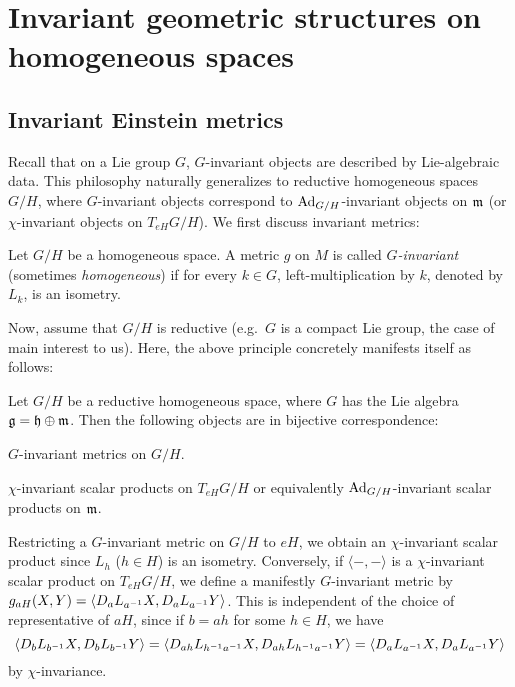 \section{Invariant geometric structures on homogeneous spaces}

\subsection{Invariant Einstein metrics}

Recall that on a Lie group $G$, $G$-invariant objects are described by Lie-algebraic data. This philosophy naturally generalizes to reductive homogeneous spaces $G/H$, where $G$-invariant objects correspond to $\operatorname{Ad}_{G/H}$-invariant objects on $\mathfrak{m}$ (or $\chi$-invariant objects on $T_{eH}G/H$). We first discuss invariant metrics:

\begin{mydef}
	Let $G/H$ be a homogeneous space. A metric $g$ on $M$ is called \emph{$G$-invariant} (sometimes \emph{homogeneous}) if for every $k\in G$, left-multiplication by $k$, denoted by $L_k$, is an isometry.
\end{mydef}

Now, assume that $G/H$ is reductive (e.g.~$G$ is a compact Lie group, the case of main interest to us). Here, the above principle concretely manifests itself as follows:

\begin{prop}\label{prop:invariantmetrics}
	Let $G/H$ be a reductive homogeneous space, where $G$ has the Lie algebra $\mathfrak{g}=\mathfrak{h}\oplus \mathfrak{m}$. Then the following objects are in bijective correspondence:
	\begin{numberedlist}
		\item $G$-invariant metrics on $G/H$.
		\item $\chi$-invariant scalar products on $T_{eH}G/H$ or equivalently $\operatorname{Ad}_{G/H}$-invariant scalar products on $\mathfrak{m}$.
	\end{numberedlist}
\end{prop}
\begin{myproof}
	Restricting a $G$-invariant metric on $G/H$ to $eH$, we obtain an $\chi$-invariant scalar product since $L_h$ ($h\in H$) is an isometry. Conversely, if $\langle-,-\rangle$ is a $\chi$-invariant scalar product on $T_{eH}G/H$, we define a manifestly $G$-invariant metric by $g_{aH}(X,Y)=\langle D_a L_{a^{-1}} X, D_a L_{a^{-1}} Y\rangle$. This is independent of the choice of representative of $aH$, since if $b=ah$ for some $h\in H$, we have
	\begin{equation*}
		\langle D_b L_{b^{-1}} X,D_b L_{b^{-1}} Y\rangle
		=\langle D_{ah} L_{h^{-1}a^{-1}} X,D_{ah} L_{h^{-1}a^{-1}} Y\rangle
		=\langle D_a L_{a^{-1}} X,D_a L_{a^{-1}} Y\rangle
	\end{equation*}
	by $\chi$-invariance.
\end{myproof}

